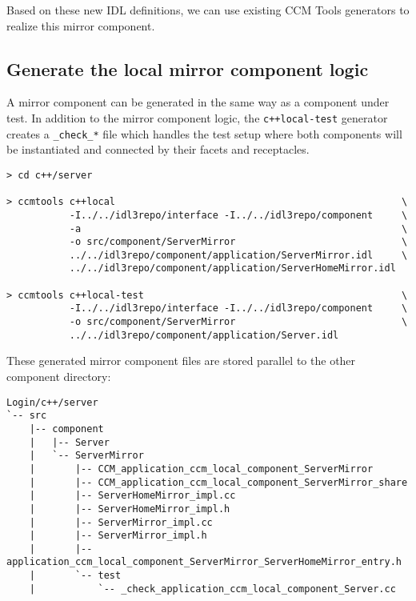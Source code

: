 Based on these new IDL definitions, we can use existing CCM Tools generators to
realize this mirror component.


\subsection{Generate the local mirror component logic}
\label{subsection:GenerateLocalMirrorComponentLogicCxx}
A mirror component can be generated in the same way as a component under test.
In addition to the mirror component logic, the {\tt c++local-test} generator creates
a {\tt \_check\_*} file which handles the test setup where both components will be
instantiated and connected by their facets and receptacles.   

\begin{footnotesize}
\begin{verbatim}
> cd c++/server

> ccmtools c++local                                                  \
           -I../../idl3repo/interface -I../../idl3repo/component     \
           -a                                                        \
           -o src/component/ServerMirror                             \
           ../../idl3repo/component/application/ServerMirror.idl     \
           ../../idl3repo/component/application/ServerHomeMirror.idl

> ccmtools c++local-test                                             \
           -I../../idl3repo/interface -I../../idl3repo/component     \
           -o src/component/ServerMirror                             \
           ../../idl3repo/component/application/Server.idl           
\end{verbatim}
\end{footnotesize}

These generated mirror component files are stored parallel to the other 
component directory:
\begin{footnotesize}
\begin{verbatim}
Login/c++/server
`-- src
    |-- component
    |   |-- Server
    |   `-- ServerMirror
    |       |-- CCM_application_ccm_local_component_ServerMirror
    |       |-- CCM_application_ccm_local_component_ServerMirror_share
    |       |-- ServerHomeMirror_impl.cc
    |       |-- ServerHomeMirror_impl.h
    |       |-- ServerMirror_impl.cc
    |       |-- ServerMirror_impl.h
    |       |-- application_ccm_local_component_ServerMirror_ServerHomeMirror_entry.h
    |       `-- test
    |           `-- _check_application_ccm_local_component_Server.cc
\end{verbatim}
\end{footnotesize}



